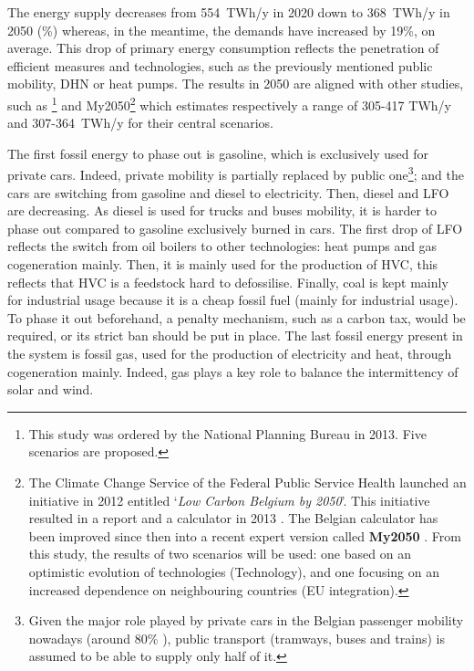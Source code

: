 The energy supply decreases from 554~TWh/y in 2020 down to 368~TWh/y in 2050 (\%) whereas, in the meantime, the demands have increased by 19\%, on average. This drop of primary energy consumption reflects the penetration of efficient measures and technologies, such as the previously mentioned public mobility, \gls{DHN} or heat pumps. The results in 2050 are aligned with other studies, such as \citet{Devogelaer2013}\footnote{This study was ordered by the National Planning Bureau in 2013. Five scenarios are proposed.} and My2050\footnote{The Climate Change Service of the Federal Public Service Health launched an initiative in 2012 entitled `\emph{Low Carbon Belgium by 2050}'. This initiative resulted in a report and a calculator in 2013 \cite{Cornet2013}. The Belgian calculator has been improved since then into a recent expert version called \textbf{My2050} \cite{My2050}. From this study, the results of two scenarios will be used: one based on an optimistic evolution of technologies (Technology), and one focusing on an increased dependence on neighbouring countries (EU integration).} \cite{My2050} which estimates respectively a range of 305-417 TWh/y and 307-364~TWh/y for their central scenarios. 

The first fossil energy to phase out is gasoline, which is exclusively used for private cars. Indeed, private mobility is partially replaced by public one\footnote{Given the major role played by private cars in the Belgian passenger mobility nowadays (\ie around 80\% \cite{BFP_mob}), public transport (\eg tramways, buses and trains) is assumed to be able to supply only half of it.}; and the cars are switching from gasoline and diesel to electricity. Then, diesel and \gls{LFO} are decreasing. As diesel is used for trucks and buses mobility, it is harder to phase out compared to gasoline exclusively burned in cars. The first drop of \gls{LFO} reflects the switch from oil boilers to other technologies: heat pumps and gas cogeneration mainly. Then, it is mainly used for the production of \gls{HVC}, this reflects that \gls{HVC} is a feedstock hard to defossilise. Finally, coal is kept mainly for industrial usage because it is a cheap fossil fuel (mainly for industrial usage). To phase it out beforehand, a penalty mechanism, such as a carbon tax, would be required, or its strict ban should be put in place. The last fossil energy present in the system is fossil gas, used for the production of electricity and heat, through cogeneration mainly. Indeed, gas plays a key role to balance the intermittency of solar and wind.

